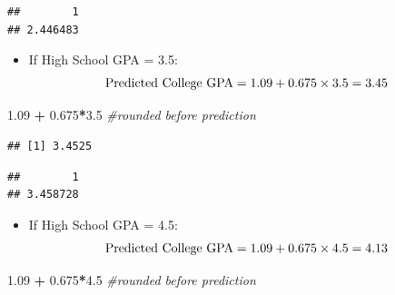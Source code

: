 \documentclass[]{book}
\newenvironment{Shaded}{\begin{snugshade}}{\end{snugshade}}
\newcommand{\CommentTok}[1]{\textcolor[rgb]{0.56,0.35,0.01}{\textit{#1}}}
\newcommand{\DataTypeTok}[1]{\textcolor[rgb]{0.13,0.29,0.53}{#1}}
\newcommand{\FloatTok}[1]{\textcolor[rgb]{0.00,0.00,0.81}{#1}}
\newcommand{\KeywordTok}[1]{\textcolor[rgb]{0.13,0.29,0.53}{\textbf{#1}}}
\newcommand{\NormalTok}[1]{#1}
\newcommand{\OperatorTok}[1]{\textcolor[rgb]{0.81,0.36,0.00}{\textbf{#1}}}
\newcommand{\StringTok}[1]{\textcolor[rgb]{0.31,0.60,0.02}{#1}}
\providecommand{\tightlist}{%
  \setlength{\itemsep}{0pt}\setlength{\parskip}{0pt}}
\begin{document}
\begin{verbatim}
##        1 
## 2.446483
\end{verbatim}

\begin{itemize}
\tightlist
\item
  If High School GPA = 3.5:\\
  \[ \hbox{Predicted College GPA} = 1.09 + 0.675 \times 3.5 = 3.45 \]
\end{itemize}

\begin{Shaded}
\begin{Highlighting}[]
\FloatTok{1.09} \OperatorTok{+}\StringTok{ }\FloatTok{0.675}\OperatorTok{*}\FloatTok{3.5} \CommentTok{#rounded before prediction}
\end{Highlighting}
\end{Shaded}

\begin{verbatim}
## [1] 3.4525
\end{verbatim}

\begin{Shaded}
\end{Shaded}

\begin{verbatim}
##        1 
## 3.458728
\end{verbatim}

\begin{itemize}
\tightlist
\item
  If High School GPA = 4.5:\\
  \[ \hbox{Predicted College GPA} = 1.09 + 0.675 \times 4.5 = 4.13 \]
\end{itemize}

\begin{Shaded}
\begin{Highlighting}[]
\FloatTok{1.09} \OperatorTok{+}\StringTok{ }\FloatTok{0.675}\OperatorTok{*}\FloatTok{4.5} \CommentTok{#rounded before prediction}
\end{Highlighting}
\end{Shaded}
\end{document}

